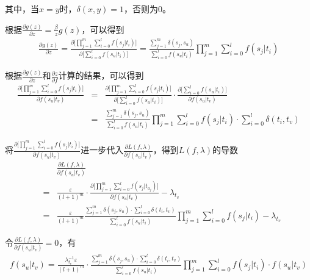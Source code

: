 \noindent 其中，当$x=y$时，$\delta(x,y)=1$，否则为0。

\parinterval 根据$\frac{\partial g(z)}{\partial z} = \frac{\beta}{z} g(z)$，可以得到
\begin{eqnarray}
\frac{\partial g(z)}{\partial z} = \frac{\partial \big[ \prod\limits_{j=1}^{m} \sum\limits_{i=0}^{l} f(s_j|t_i) \big]}{\partial \big[ \sum\limits_{i=0}^{l}f(s_u|t_i) \big]} = \frac{\sum\limits_{j=1}^{m} \delta(s_j,s_u)}{\sum\limits_{i=0}^{l}f(s_u|t_i)} \prod\limits_{j=1}^{m} \sum\limits_{i=0}^{l} f(s_j|t_i)
\label{eq:5-35}
\end{eqnarray}

\parinterval 根据$\frac{\partial g(z)}{\partial z}$和$\frac{\partial z}{\partial f}$计算的结果，可以得到
\begin{eqnarray}
{\frac{\partial \big[ \prod_{j=1}^{m} \sum_{i=0}^{l} f(s_j|t_i) \big]}{\partial f(s_u|t_v)}}& =& {{\frac{\partial \big[ \prod\limits_{j=1}^{m} \sum\limits_{i=0}^{l} f(s_j|t_i) \big]}{\partial \big[ \sum\limits_{i=0}^{l}f(s_u|t_i) \big]}} \cdot{\frac{\partial \big[ \sum\limits_{i=0}^{l}f(s_u|t_i) \big]}{\partial f(s_u|t_v)}}} \nonumber \\
& = &{\frac{\sum\limits_{j=1}^{m} \delta(s_j,s_u)}{\sum\limits_{i=0}^{l}f(s_u|t_i)} \prod\limits_{j=1}^{m} \sum\limits_{i=0}^{l} f(s_j|t_i) \cdot \sum\limits_{i=0}^{l} \delta(t_i,t_v)}
\label{eq:5-36}
\end{eqnarray}

\parinterval 将$\frac{\partial \big[ \prod_{j=1}^{m} \sum_{i=0}^{l} f(s_j|t_i) \big]}{\partial f(s_u|t_v)}$进一步代入$\frac{\partial L(f,\lambda)}{\partial f(s_u|t_v)}$，得到$L(f,\lambda)$的导数
\begin{eqnarray}
& &{\frac{\partial L(f,\lambda)}{\partial f(s_u|t_v)}}\nonumber \\
&=&{\frac{\varepsilon}{(l+1)^{m}} \cdot \frac{\partial \big[ \prod\limits_{j=1}^{m} \sum\limits_{i=0}^{l} f(s_j|t_{a_j}) \big]}{\partial f(s_u|t_v)} - \lambda_{t_v}}\nonumber \\
&=&{\frac{\varepsilon}{(l+1)^{m}} \frac{\sum_{j=1}^{m} \delta(s_j,s_u) \cdot \sum_{i=0}^{l} \delta(t_i,t_v)}{\sum_{i=0}^{l}f(s_u|t_i)} \prod\limits_{j=1}^{m} \sum\limits_{i=0}^{l} f(s_j|t_i) - \lambda_{t_v}}
\label{eq:5-37}
\end{eqnarray}

\parinterval 令$\frac{\partial L(f,\lambda)}{\partial f(s_u|t_v)}=0$，有
\begin{eqnarray}
f(s_u|t_v) = \frac{\lambda_{t_v}^{-1} \varepsilon}{(l+1)^{m}} \cdot \frac{\sum\limits_{j=1}^{m} \delta(s_j,s_u) \cdot \sum\limits_{i=0}^{l} \delta(t_i,t_v)}{\sum\limits_{i=0}^{l}f(s_u|t_i)} \prod\limits_{j=1}^{m} \sum\limits_{i=0}^{l} f(s_j|t_i) \cdot f(s_u|t_v)
\label{eq:5-38}
\end{eqnarray}

